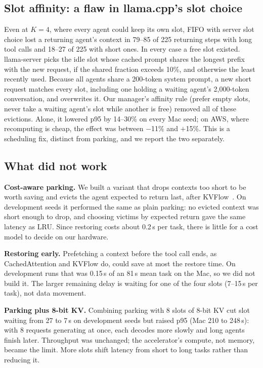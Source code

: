 \documentclass[conference,letterpaper]{IEEEtran}
\begin{document}
\subsection{Slot affinity: a flaw in llama.cpp's slot choice}
Even at $K=4$, where every agent could keep its own slot, FIFO with server slot choice lost a returning agent's context in 79--85 of 225 returning steps with long tool calls and 18--27 of 225 with short ones. In every case a free slot existed. llama-server picks the idle slot whose cached prompt shares the longest prefix with the new request, if the shared fraction exceeds 10\%, and otherwise the least recently used. Because all agents share a 200-token system prompt, a new short request matches every slot, including one holding a waiting agent's 2,000-token conversation, and overwrites it. Our manager's affinity rule (prefer empty slots, never take a waiting agent's slot while another is free) removed all of these evictions. Alone, it lowered p95 by 14--30\% on every Mac seed; on AWS, where recomputing is cheap, the effect was between $-$11\% and $+$15\%. This is a scheduling fix, distinct from parking, and we report the two separately.

\subsection{What did not work}
\textbf{Cost-aware parking.} We built a variant that drops contexts too short to be worth saving and evicts the agent expected to return last, after KVFlow~\cite{pan2025kvflow}. On development seeds it performed the same as plain parking: no evicted context was short enough to drop, and choosing victims by expected return gave the same latency as LRU. Since restoring costs about 0.2\,s per task, there is little for a cost model to decide on our hardware.

\textbf{Restoring early.} Prefetching a context before the tool call ends, as CachedAttention and KVFlow do, could save at most the restore time. On development runs that was 0.15\,s of an 81\,s mean task on the Mac, so we did not build it. The larger remaining delay is waiting for one of the four slots (7--15\,s per task), not data movement.

\textbf{Parking plus 8-bit KV.} Combining parking with 8 slots of 8-bit KV cut slot waiting from 27 to 7\,s on development seeds but raised p95 (Mac 210 to 248\,s): with 8 requests generating at once, each decodes more slowly and long agents finish later. Throughput was unchanged; the accelerator's compute, not memory, became the limit. More slots shift latency from short to long tasks rather than reducing it.
\end{document}
